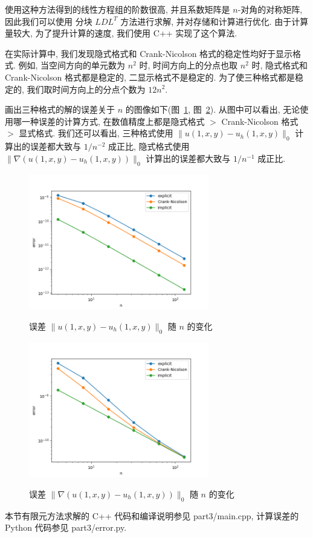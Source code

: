 \documentclass[UTF8]{article}
\begin{document}
    使用这种方法得到的线性方程组的阶数很高, 并且系数矩阵是 $n$-对角的对称矩阵, 因此我们可以使用 分块 $LDL^T$ 方法进行求解, 并对存储和计算进行优化.
    由于计算量较大, 为了提升计算的速度, 我们使用 C++ 实现了这个算法.

    在实际计算中, 我们发现隐式格式和 Crank-Nicolson 格式的稳定性均好于显示格式.
    例如, 当空间方向的单元数为 $n^2$ 时, 时间方向上的分点也取 $n^2$ 时, 隐式格式和 Crank-Nicolson 格式都是稳定的, 二显示格式不是稳定的.
    为了使三种格式都是稳定的, 我们取时间方向上的分点个数为 $12n^2$.

    画出三种格式的解的误差关于 $n$ 的图像如下(图~\ref{fig:figure5}, 图~\ref{fig:figure6}).
    从图中可以看出, 无论使用哪一种误差的计算方式, 在数值精度上都是隐式格式 $>$ Crank-Nicolson 格式 $>$ 显式格式.
    我们还可以看出, 三种格式使用 $\|u(1,x,y)-u_h(1,x,y)\|_0$ 计算出的误差都大致与 $1/n^{-2}$ 成正比, 隐式格式使用 $\|\nabla(u(1,x,y)-u_h(1,x,y))\|_0$ 计算出的误差都大致与 $1/n^{-1}$ 成正比.

    \begin{figure}[h]
        \centering
        \caption{误差 $\|u(1,x,y)-u_h(1,x,y)\|_0$ 随 $n$ 的变化}
        \includegraphics[width=0.7\textwidth]{./assets/L2_error}
        \label{fig:figure5}
    \end{figure}

    \begin{figure}[h]
        \centering
        \caption{误差 $\|\nabla(u(1,x,y)-u_h(1,x,y))\|_0$ 随 $n$ 的变化}
        \includegraphics[width=0.7\textwidth]{./assets/H1_error}
        \label{fig:figure6}
    \end{figure}
    
    本节有限元方法求解的 C++ 代码和编译说明参见 part3/main.cpp, 计算误差的 Python 代码参见 part3/error.py.
\end{document}
